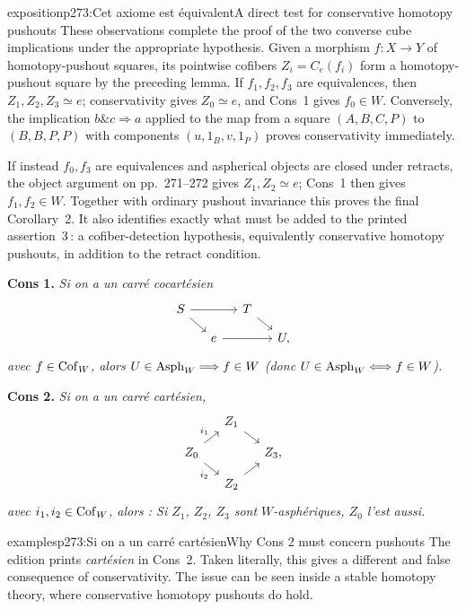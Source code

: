 \begin{enumerate}
\begin{dcomment}{exposition}{p273:Cet axiome est équivalent}{A direct test for conservative homotopy pushouts}
These observations complete the proof of the two converse cube implications under the appropriate hypothesis. Given a morphism $f:X\to Y$ of homotopy-pushout squares, its pointwise cofibers $Z_i=C_e(f_i)$ form a homotopy-pushout square by the preceding lemma. If $f_1,f_2,f_3$ are equivalences, then $Z_1,Z_2,Z_3\simeq e$; conservativity gives $Z_0\simeq e$, and Cons~1 gives $f_0\in W$. Conversely, the implication $b\mathbin{\&}c\Rightarrow a$ applied to the map from a square $(A,B,C,P)$ to $(B,B,P,P)$ with components $(u,1_B,v,1_P)$ proves conservativity immediately.

If instead $f_0,f_3$ are equivalences and aspherical objects are closed under retracts, the object argument on pp.~271--272 gives $Z_1,Z_2\simeq e$; Cons~1 then gives $f_1,f_2\in W$. Together with ordinary pushout invariance this proves the final Corollary~2. It also identifies exactly what must be added to the printed assertion~3\,\textdegree{}: a cofiber-detection hypothesis, equivalently conservative homotopy pushouts, in addition to the retract condition.
\end{dcomment}


\textbf{Cons 1.} \textit{Si on a un carré cocartésien}
\[
\begin{tikzcd}[ampersand replacement=\&, column sep=small, row sep=small]
S \arrow[rr] \arrow[dr] \& \& T \arrow[dr] \& \\
 \& e \arrow[rr] \& \& U,
\end{tikzcd}
\]
\textit{avec $f \in \mathrm{Cof}_W$, alors $U \in \mathrm{Asph}_W \Longrightarrow f \in W$ (donc $U \in \mathrm{Asph}_W \Longleftrightarrow f \in W$).}

\textbf{Cons 2.} \textit{Si on a un carré cartésien,}
\[
\begin{tikzcd}[ampersand replacement=\&, column sep=small, row sep=small]
 \& Z_1 \arrow[dr] \& \\
Z_0 \arrow[ur, "i_1"] \arrow[dr, "i_2"'] \& \& Z_3, \\
 \& Z_2 \arrow[ur] \&
\end{tikzcd}
\]
\textit{avec $i_1, i_2 \in \mathrm{Cof}_W$, alors : Si $Z_1$, $Z_2$, $Z_3$ sont $W$-asphériques, $Z_0$ l'est aussi.}

\begin{dcomment}{examples}{p273:Si on a un carré cartésien}{Why Cons 2 must concern pushouts}
The edition prints \emph{cartésien} in Cons~2. Taken literally, this gives a different and false consequence of conservativity. The issue can be seen inside a stable homotopy theory, where conservative homotopy pushouts do hold.


\end{dcomment}
\end{enumerate}
